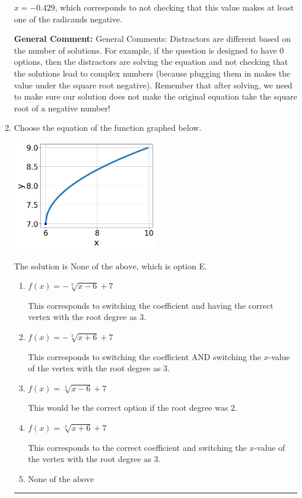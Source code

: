 \documentclass{extbook}[14pt]
\newcommand{\litem}[1]{\item #1

\rule{\textwidth}{0.4pt}}
\begin{document}
\begin{enumerate}
{\begin{enumerate}[label=\Alph*.]
$x = -0.429$, which corresponds to not checking that this value makes at least one of the radicands negative.
\end{enumerate}

\textbf{General Comment:} General Comments: Distractors are different based on the number of solutions. For example, if the question is designed to have 0 options, then the distractors are solving the equation and not checking that the solutions lead to complex numbers (because plugging them in makes the value under the square root negative). Remember that after solving, we need to make sure our solution does not make the original equation take the square root of a negative number!
}
\litem{
Choose the equation of the function graphed below.

\begin{center}
    \includegraphics[width=0.5\textwidth]{../Figures/radicalGraphToEquationC.png}
\end{center}


The solution is \( \text{None of the above} \), which is option E.\begin{enumerate}[label=\Alph*.]
\item \( f(x) = - \sqrt[3]{x - 6} + 7 \)

This corresponds to switching the coefficient and having the correct vertex with the root degree as $3$.
\item \( f(x) = - \sqrt[3]{x + 6} + 7 \)

This corresponds to switching the coefficient AND switching the $x$-value of the vertex with the root degree as $3$.
\item \( f(x) = \sqrt[3]{x - 6} + 7 \)

This would be the correct option if the root degree was $2$.
\item \( f(x) = \sqrt[3]{x + 6} + 7 \)

This corresponds to the correct coefficient and switching the $x$-value of the vertex with the root degree as $3$.
\item \( \text{None of the above} \)


\end{enumerate}}
\end{enumerate}
\end{document}
